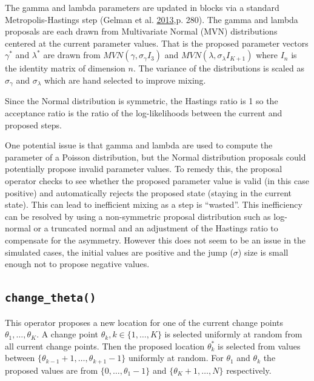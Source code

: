 \documentclass[11pt,a4paper]{article}
\numberwithin{equation}{section}
\begin{document}
The gamma and lambda parameters are updated in blocks via a standard
Metropolis-Hastings step (Gelman et al.
\protect\hyperlink{ref-gelman_bayesian_2013}{2013},p. 280). The gamma
and lambda proposals are each drawn from Multivariate Normal (MVN)
distributions centered at the current parameter values. That is the
proposed parameter vectors \(\gamma^*\) and \(\lambda^*\) are drawn from
\(MVN(\gamma, \sigma_\gamma I_3)\) and
\(MVN(\lambda, \sigma_\lambda I_{K+1})\) where \(I_n\) is the identity
matrix of dimension \(n\). The variance of the distributions is scaled
as \(\sigma_\gamma\) and \(\sigma_\lambda\) which are hand selected to
improve mixing.

Since the Normal distribution is symmetric, the Hastings ratio is 1 so
the acceptance ratio is the ratio of the log-likelihoods between the
current and proposed steps.

One potential issue is that gamma and lambda are used to compute the
parameter of a Poisson distribution, but the Normal distribution
proposals could potentially propose invalid parameter values. To remedy
this, the proposal operator checks to see whether the proposed parameter
value is valid (in this case positive) and automatically rejects the
proposed state (staying in the current state). This can lead to
inefficient mixing as a step is ``wasted''.  This inefficiency can be
resolved by using a non-symmetric proposal distribution such as
log-normal or a truncated normal and an adjustment of the Hastings ratio
to compensate for the asymmetry. However this does not seem to be an
issue in the simulated cases, the initial values are positive and the
jump (\(\sigma\)) size is small enough not to propose negative values.

\hypertarget{change_theta}{%
\subsection{\texorpdfstring{\texttt{change\_theta()}}{change\_theta()}}\label{change_theta}}

This operator proposes a new location for one of the current change
points \(\theta_1,\dots, \theta_K\). A change
point \dw{ } \(\theta_k, k \in \{1, \dots, K\}\) is selected uniformly at random
from all current change points. Then the proposed location
\(\theta_k^*\) is selected from values between
\(\{\theta_{k-1}+1,\dots, \theta_{k+1}-1\}\) uniformly at random. For
\(\theta_1\) and \(\theta_k\) the proposed values are from
\(\{0,\dots, \theta_1-1\}\) and \(\{\theta_K+1,\dots, N\}\)
respectively.
\end{document}
